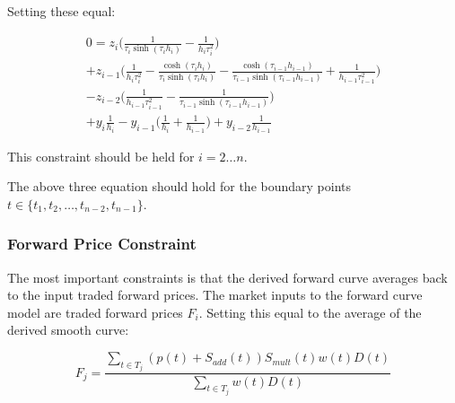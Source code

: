 \documentclass{article}
\begin{document}
Setting these equal:

\begin{multline}
    0 = z_i \biggl( \frac{1}{\tau_i \sinh(\tau_i h_i)} - \frac{1}{h_i \tau_i^2} \biggr) \\
        + z_{i-1} \biggl( \frac{1}{h_i \tau_i^2} -\frac{ \cosh(\tau_i h_i)}{\tau_i \sinh(\tau_i h_i)}
        - \frac{ \cosh(\tau_{i-1} h_{i-1})}{\tau_{i-1} \sinh(\tau_{i-1} h_{i-1})} + \frac{1}{h_{i-1} \tau_{i-1}^2}\biggr)\\
        - z_{i-2} \biggl( \frac{1}{h_{i-1} \tau_{i-1}^2} - \frac{1}{\tau_{i-1} \sinh(\tau_{i-1} h_{i-1})} \biggr)\\
        + y_i \frac{1}{h_i} - y_{i - 1} \bigl( \frac{1}{h_i} + \frac{1}{h_{i-1}} \bigr)
        + y_{i-2} \frac{1}{h_{i-1}}
\end{multline}

This constraint should be held for $i = 2 \hdots n$.

\bigskip

The above three equation should hold for the boundary points \\
$t \in \{t_1, t_2, \hdots, t_{n-2}, t_{n-1}\}$.

\subsubsection{Forward Price Constraint}
The most important constraints is that the derived forward curve averages back to the 
input traded forward prices.
The market inputs to the forward curve model are traded forward prices $F_i$.
Setting this equal to the average of the derived smooth curve:

\begin{equation}
    \label{eq:traded_forward_calc}
    F_j = \frac{\sum_{t \in T_j} (p(t) + S_{add}(t))S_{mult}(t)w(t)D(t)}
    {\sum_{t \in T_j} w(t)D(t)}
\end{equation}
\end{document}
